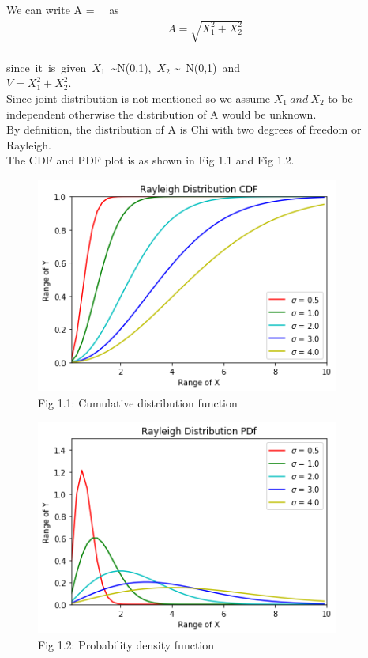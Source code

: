 \documentclass[journal,12pt,twocolumn]{IEEEtran}
\begin{document}
\subsection*{}\\
We can write A = \ \ as\\

\begin{align}A = \sqrt{X_1^2 + X_2^2}\end{align}\\

since\ it\ is\ given\ $X_1$\ \sim N(0,1),\ $X_2$ \sim\ N(0,1)\ and\ \\
$V = X_1^2 + X_2^2$.\\

Since joint distribution is not mentioned so we assume $X_1\ and\ X_2$ to be independent otherwise the distribution of A would be unknown.\\

By definition, the distribution of A is Chi with two degrees of freedom or Rayleigh.\\

The CDF and PDF plot is as shown in Fig 1.1 and Fig 1.2.

\begin{figure}[h!]
    \centering
    \includegraphics[width=10cm]{Assignment-1/Codes/Figures/CDF.png}
    \caption*{Fig 1.1: Cumulative distribution function}
\end{figure}

\begin{figure}[h!]
    \centering
    \includegraphics[width=10cm]{Assignment-1/Codes/Figures/PDf.png}
    \caption*{Fig 1.2: Probability density function}
\end{figure}\\
\end{document}
